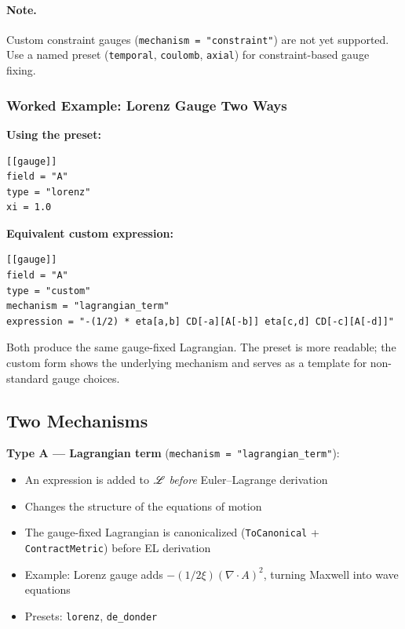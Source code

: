 \paragraph{Note.}
Custom constraint gauges (\texttt{mechanism = "constraint"}) are not yet
supported. Use a named preset (\texttt{temporal}, \texttt{coulomb}, \texttt{axial}) for
constraint-based gauge fixing.

\subsubsection{Worked Example: Lorenz Gauge Two Ways}
\label{sec:gauge-lorenz-example}

\textbf{Using the preset:}

\begin{lstlisting}[style=toml]
[[gauge]]
field = "A"
type = "lorenz"
xi = 1.0
\end{lstlisting}

\textbf{Equivalent custom expression:}

\begin{lstlisting}[style=toml]
[[gauge]]
field = "A"
type = "custom"
mechanism = "lagrangian_term"
expression = "-(1/2) * eta[a,b] CD[-a][A[-b]] eta[c,d] CD[-c][A[-d]]"
\end{lstlisting}

Both produce the same gauge-fixed Lagrangian. The preset is more readable;
the custom form shows the underlying mechanism and serves as a template for
non-standard gauge choices.

\subsection{Two Mechanisms}
\label{sec:gauge-mechanisms}

\textbf{Type A --- Lagrangian term} (\texttt{mechanism = "lagrangian\_term"}):

\begin{itemize}
  \item An expression is added to $\mathscr{L}$ \emph{before} Euler--Lagrange derivation
  \item Changes the structure of the equations of motion
  \item The gauge-fixed Lagrangian is canonicalized (\texttt{ToCanonical} + \texttt{ContractMetric})
    before EL derivation
  \item Example: Lorenz gauge adds $-(1/2\xi)(\nabla \cdot A)^2$, turning Maxwell into wave equations
  \item Presets: \texttt{lorenz}, \texttt{de\_donder}
\end{itemize}

